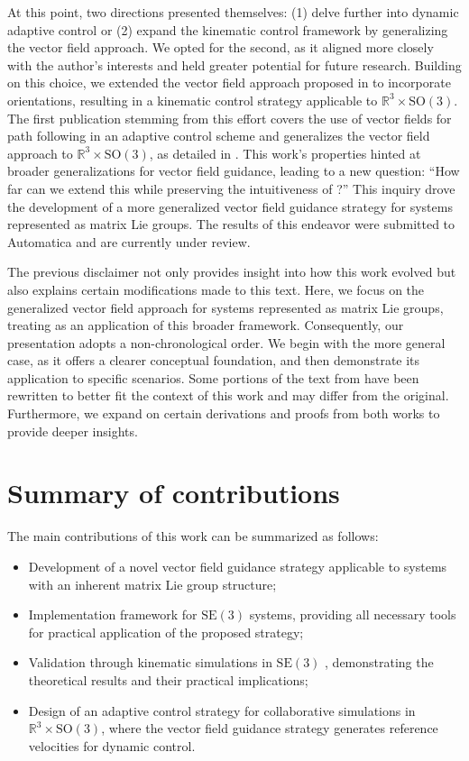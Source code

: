 At this point, two directions presented themselves: (1) delve further into dynamic adaptive control or (2) expand the kinematic control framework by generalizing the vector field approach. We opted for the second, as it aligned more closely with the author's interests and held greater potential for future research. Building on this choice, we extended the vector field approach proposed in \citet{Rezende2022} to incorporate orientations, resulting in a kinematic control strategy applicable to $\mathbb{R}^3\times\text{SO}(3)$. The first publication stemming from this effort covers the use of vector fields for path following in an adaptive control scheme and generalizes the vector field approach to $\mathbb{R}^3\times\text{SO}(3)$, as detailed in \citet{Pessoa2024}. This work's properties hinted at broader generalizations for vector field guidance, leading to a new question: ``How far can we extend this while preserving the intuitiveness of \citet{Rezende2022}?'' This inquiry drove the development of a more generalized vector field guidance strategy for systems represented as matrix Lie groups. The results of this endeavor were submitted to Automatica and are currently under review.

The previous disclaimer not only provides insight into how this work evolved but also explains certain modifications made to this text. Here, we focus on the generalized vector field approach for systems represented as matrix Lie groups, treating \citet{Pessoa2024} as an application of this broader framework. Consequently, our presentation adopts a non-chronological order. We begin with the more general case, as it offers a clearer conceptual foundation, and then demonstrate its application to specific scenarios. Some portions of the text from \citet{Pessoa2024} have been rewritten to better fit the context of this work and may differ from the original. Furthermore, we expand on certain derivations and proofs from both works to provide deeper insights.
\section{Summary of contributions}
The main contributions of this work can be summarized as follows:
\begin{itemize}
    \item Development of a novel vector field guidance strategy applicable to systems with an inherent matrix Lie group structure;
    \item Implementation framework for $\text{SE}(3)$ systems, providing all necessary tools for practical application of the proposed strategy;
    \item Validation through kinematic simulations in $\text{SE}(3)$ , demonstrating the theoretical results and their practical implications;
    \item Design of an adaptive control strategy for collaborative simulations in $\mathbb{R}^3 \times \text{SO}(3)$, where the vector field guidance strategy generates reference velocities for dynamic control.
\end{itemize}

